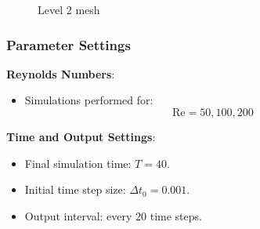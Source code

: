\documentclass{settings/laserbeam}
\begin{document}
\begin{frame}
\begin{center}
\begin{figure}[H]
\begin{minipage}{0.4\linewidth}
\begin{center}
                    \caption{Level 2 mesh}
                \end{center}
            \end{minipage}
        \end{figure}
    \end{center}

\end{frame}

\begin{frame}
    
    \frametitle{Parameter Settings}

    \begin{cbox}
    \textbf{Reynolds Numbers}:
    \begin{itemize}
        \item Simulations performed for:
        $$
        \text{Re} = 50, 100, 200
        $$
    \end{itemize}
    \end{cbox}
    \vspace{0.5cm}
    \begin{cbox}
    \textbf{Time and Output Settings}:
    \begin{itemize}
        \item Final simulation time: $T=40$.
        \item Initial time step size: $\Delta t_0=0.001$.
        \item Output interval: every $20$ time steps.
    \end{itemize}
    \end{cbox}

\end{frame}
\end{document}
